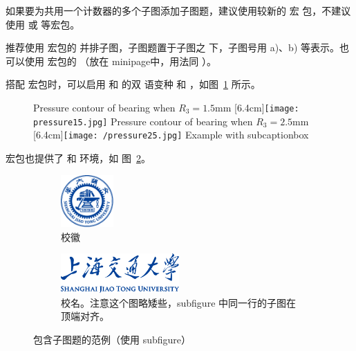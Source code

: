如果要为共用一个计数器的多个子图添加子图题，建议使用较新的 宏
包，不建议使用  或  等宏包。

推荐使用  宏包的  并排子图，子图题置于子图之
下，子图号用 a)、b) 等表示。也可以使用  宏包的 
（放在 minipage中，用法同 ）。

搭配  宏包时，可以启用  和  的双
语变种  和 ，如图~\ref{fig:bisubcaptionbox}
所示。

\begin{figure}[!hbtp]
  \centering
                  {Pressure contour of bearing when $R_3 = 1.5\text{mm}$}%
                  [6.4cm]{\texttt{[image: pressure15.jpg]}}
  \hspace{1cm}
                  {Pressure contour of bearing when $R_3 = 2.5\text{mm}$}%
                  [6.4cm]{\texttt{[image: /pressure25.jpg]}}
            {Example with subcaptionbox}
  \label{fig:bisubcaptionbox}
\end{figure}

 宏包也提供了  和  环境，如
图~\ref{fig:subfigure}。

\begin{figure}[!htp]
  \centering
  \begin{subfigure}{0.3\textwidth}
    \centering
    \includegraphics[height=2cm]{pdf/sjtu-badge.pdf}
    \caption{校徽}
  \end{subfigure}
  \hspace{1cm}
  \begin{subfigure}{0.4\textwidth}
    \centering
    \includegraphics[height=1.5cm]{pdf/sjtu-name.pdf}
    \caption{校名。注意这个图略矮些，subfigure 中同一行的子图在顶端对齐。}
  \end{subfigure}
  \caption{包含子图题的范例（使用 subfigure）}
  \label{fig:subfigure}
\end{figure}

